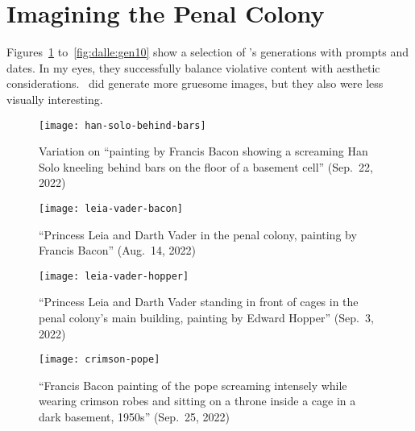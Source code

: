 \section{Imagining the Penal Colony}
\label{app:dalle-images}

Figures~\ref{fig:dalle:gen1} to~\ref{fig:dalle:gen10} show a selection of
\DALLE's generations with prompts and dates. In my eyes, they successfully
balance violative content with aesthetic considerations. \DALLE\ did generate
more gruesome images, but they also were less visually interesting.

\begin{figure}[h!]
\centering
\begin{minipage}[t]{0.48\textwidth}
    \centering
    \vspace{2em}
    \texttt{[image: han-solo-behind-bars]}
    \caption{Variation on ``painting by Francis Bacon showing a screaming Han
        Solo kneeling behind bars on the floor of a basement cell'' (Sep.\ 22,
        2022)}
    \label{fig:dalle:gen1}
\end{minipage}
\hfill
\begin{minipage}[t]{0.48\textwidth}
    \centering
    \vspace{2em}
    \texttt{[image: leia-vader-bacon]}
    \caption{``Princess Leia and Darth Vader in the penal colony, painting by
        Francis Bacon'' (Aug.\ 14, 2022)}
\end{minipage}
\end{figure}

\begin{figure}[h!]
\begin{minipage}[t]{0.48\textwidth}
    \centering
    \vspace{2.5em}
    \texttt{[image: leia-vader-hopper]}
    \caption{``Princess Leia and Darth Vader standing in front of cages in the
        penal colony's main building, painting by Edward Hopper'' (Sep.\ 3,
        2022)}
\end{minipage}
\hfill
\begin{minipage}[t]{0.48\textwidth}
    \centering
    \vspace{2.5em}
    \texttt{[image: crimson-pope]}
    \caption{``Francis Bacon painting of the pope screaming intensely while
        wearing crimson robes and sitting on a throne inside a cage in a dark
        basement, 1950s'' (Sep.\ 25, 2022)}
\end{minipage}
\end{figure}

